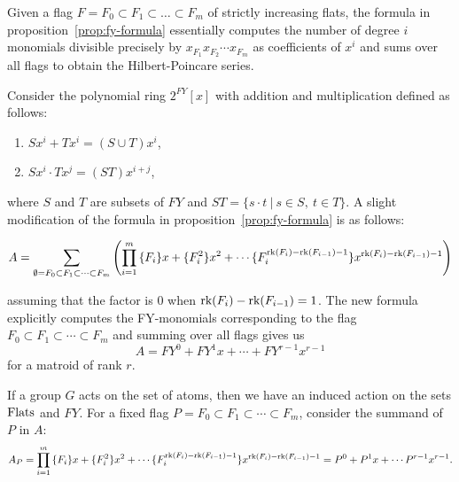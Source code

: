 \documentclass[11pt]{article}
\newcommand{\rank}{\normalfont\text{rk}}
\newcommand{\flats}{\normalfont\text{Flats}}
\theoremstyle{remark}
\begin{document}
\hspace*{5mm}
Given a flag $F = F_0\subset F_1\subset\ldots\subset F_m$ of strictly increasing flats, the formula in
proposition~\ref{prop:fy-formula} essentially computes the number of degree $i$ monomials divisible
precisely by $x_{F_1}x_{F_2}\cdots x_{F_m}$ as coefficients of $x^i$ and sums over all flags to obtain the
Hilbert-Poincare series.

\hrulefill

Consider the polynomial ring $2^{FY}[x]$ with addition and multiplication defined as follows:
\begin{enumerate}
    \item $Sx^i + Tx^i = (S\cup T)x^i$,
    \item $Sx^i\cdot Tx^j = (ST)x^{i+j}$,
\end{enumerate}
where $S$ and $T$ are subsets of $FY$ and $ST=\{s\cdot t\ |\ s\in S,\ t\in T\}$.
A slight modification of the formula in proposition~\ref{prop:fy-formula} is as follows:

\begin{equation}
    \label{eqn:modH}
    A = \sum_{\emptyset = F_0\subset F_1\subset \cdots\subset F_m}{\left(\prod_{i=1}^m{
        \{F_i\}x + \{F_i^2\}x^2+ \cdots \{F_i^{\rank(F_i)-\rank(F_{i-1})-1}\}x^{\rank(F_i)-\rank(F_{i-1})-1}
    }\right)}
\end{equation}

assuming that the factor is 0 when $\rank(F_i)-\rank(F_{i-1}) = 1$. The new formula explicitly computes
the FY-monomials corresponding to the flag $F_0\subset F_1\subset \cdots\subset F_m$ and summing over all flags gives us
$$A = FY^0 + FY^1x + \cdots + FY^{r-1}x^{r-1}$$
for a matroid of rank $r$.

\hrulefill

If a group $G$ acts on the set of atoms, then we have an induced action on the sets $\flats$ and $FY$.
For a fixed flag $P = F_0\subset F_1\subset \cdots\subset F_m$, consider the summand of $P$ in $A$:
    $$A_P = 
    \prod_{i=1}^m{
        \{F_i\}x + \{F_i^2\}x^2+ \cdots \{F_i^{\rank(F_i)-\rank(F_{i-1})-1}\}x^{\rank(F_i)-\rank(F_{i-1})-1}
    } = P^0 + P^1x+\cdots P^{r-1}x^{r-1}.$$
\end{document}
